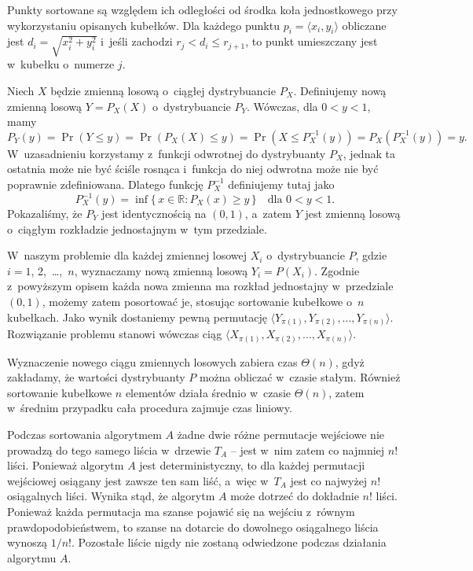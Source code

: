Punkty sortowane są względem ich odległości od środka koła jednostkowego przy wykorzystaniu opisanych kubełków.
Dla każdego punktu $p_i=\langle x_i,y_i\rangle$ obliczane jest $d_i=\sqrt{x_i^2+y_i^2}$ i~jeśli zachodzi $r_j<d_i\le r_{j+1}$, to punkt umieszczany jest w~kubełku o~numerze $j$.

\exercise %
Niech $X$ będzie zmienną losową o~ciągłej dystrybuancie $P_X$.
Definiujemy nową zmienną losową $Y=P_X(X)$ o~dystrybuancie $P_Y$.
Wówczas, dla $0<y<1$, mamy
\[
    P_Y(y) = \Pr(Y\le y) = \Pr(P_X(X)\le y) = \Pr(X\le P_X^{-1}(y)) = P_X(P_X^{-1}(y)) = y.
\]
W~uzasadnieniu korzystamy z~funkcji odwrotnej do dystrybuanty $P_X$, jednak ta ostatnia może nie być ściśle rosnąca i~funkcja do niej odwrotna może nie być poprawnie zdefiniowana.
Dlatego funkcję $P_X^{-1}$ definiujemy tutaj jako
\[
	P_X^{-1}(y) = \inf\{\,x\in\mathbb{R}:P_X(x)\ge y\,\} \quad\text{dla $0<y<1$}.
\]
Pokazaliśmy, że $P_Y$ jest identycznością na $(0,1)$, a~zatem $Y$ jest zmienną losową o~ciągłym rozkładzie jednostajnym w~tym przedziale.

W~naszym problemie dla każdej zmiennej losowej $X_i$ o~dystrybuancie $P$, gdzie $i=1$, 2,~\dots,~$n$, wyznaczamy nową zmienną losową $Y_i=P(X_i)$.
Zgodnie z~powyższym opisem każda nowa zmienna ma rozkład jednostajny w~przedziale $(0,1)$, możemy zatem posortować je, stosując sortowanie kubełkowe o~$n$ kubełkach.
Jako wynik dostaniemy pewną permutację $\langle Y_{\pi(1)},Y_{\pi(2)},\dots,Y_{\pi(n)}\rangle$.
Rozwiązanie problemu stanowi wówczas ciąg $\langle X_{\pi(1)},X_{\pi(2)},\dots,X_{\pi(n)}\rangle$.

Wyznaczenie nowego ciągu zmiennych losowych zabiera czas $\Theta(n)$, gdyż zakładamy, że wartości dystrybuanty $P$ można obliczać w~czasie stałym.
Również sortowanie kubełkowe $n$ elementów działa średnio w~czasie $\Theta(n)$, zatem w~średnim przypadku cała procedura zajmuje czas liniowy.

\problems


\subproblem %
Podczas sortowania algorytmem $A$ żadne dwie różne permutacje wejściowe nie prowadzą do tego samego liścia w~drzewie $T_A$ -- jest w~nim zatem co najmniej $n!$ liści.
Ponieważ algorytm $A$ jest deterministyczny, to dla każdej permutacji wejściowej osiągany jest zawsze ten sam liść, a~więc w~$T_A$ jest co najwyżej $n!$ osiągalnych liści.
Wynika stąd, że algorytm $A$ może dotrzeć do dokładnie $n!$ liści.
Ponieważ każda permutacja ma szanse pojawić się na wejściu z~równym prawdopodobieństwem, to szanse na dotarcie do dowolnego osiągalnego liścia wynoszą $1/n!$.
Pozostałe liście nigdy nie zostaną odwiedzone podczas działania algorytmu $A$.

